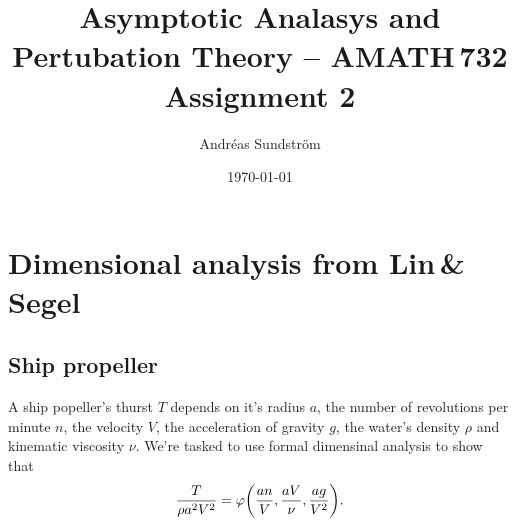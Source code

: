 \documentclass[11pt,letter, swedish, english
]{article}
\begin{document}
\title{Asymptotic Analasys and Pertubation Theory -- AMATH\,732 \\
Assignment 2}
\author{Andréas Sundström}
\date{\today}

\maketitle



\section{Dimensional analysis from Lin\,\&\,Segel}
\setcounter{subsection}{4}
\subsection{Ship propeller}
A ship popeller's thurst $T$ depends on it's radius $a$, the number of
revolutions per minute $n$, the velocity $V$, the acceleration of
gravity $g$, the water's density $\rho$ and kinematic viscosity $\nu$.
We're tasked to use formal dimensinal analysis to show that
\begin{equation}
\frac{T}{\rho a^2 V^2} = 
\varphi\qty(\frac{an}{V}, \frac{aV}{\nu}, \frac{ag}{V^2}).
\end{equation}
\end{document}

